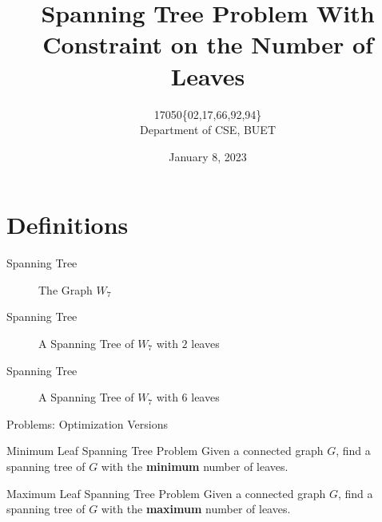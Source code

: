 \documentclass{beamer}
\title{Spanning Tree Problem With Constraint on the Number of Leaves}
\author{17050\{02,17,66,92,94\} \\ Department of CSE, BUET}
\date{January 8, 2023}
\begin{document}
\begin{frame}
\centering
\maketitle
\end{frame}

\section{Definitions}


\begin{frame}{Spanning Tree}
\begin{figure}
  \vspace{1 cm}
  \caption{The Graph $W_7$}
\end{figure}
\end{frame}
\begin{frame}{Spanning Tree}
\begin{figure}
  \vspace{1 cm}
  \caption{A Spanning Tree of $W_7$ with $2$ leaves}
\end{figure}
\end{frame}
\begin{frame}{Spanning Tree}
\begin{figure}
  \vspace{1 cm}
  \caption{A Spanning Tree of $W_7$ with $6$ leaves}
\end{figure}
\end{frame}

\begin{frame}{Problems: Optimization Versions}

\begin{exampleblock}{Minimum Leaf Spanning Tree Problem}
 Given a connected graph $G$, find a spanning tree of $G$ with the \textbf{minimum} number of leaves.
\end{exampleblock}
\vspace{0.7 cm}
\begin{exampleblock}{Maximum Leaf Spanning Tree Problem}
 Given a connected graph $G$, find a spanning tree of $G$ with the \textbf{maximum} number of leaves.
\end{exampleblock}

\end{frame}
\end{document}
